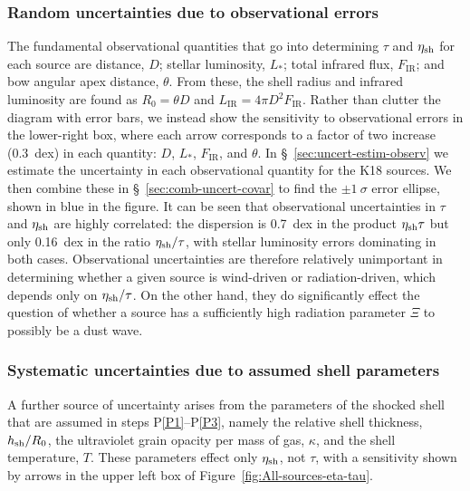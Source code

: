 \message{ !name(bs-bw-dw-03.tex)}\documentclass[useAMS, usenatbib, a4paper]{mnras}
\begin{document}
\subsubsection{Random uncertainties due to observational errors}
\label{sec:rand-syst-uncert}

The fundamental observational quantities that go into determining
\(\tau\) and \(\eta_{\text{sh}}\) for each source are distance, \(D\);
stellar luminosity, \(L_*\); total infrared flux, \(F_{\text{IR}}\);
and bow angular apex distance, \(\theta\).  From these, the shell
radius and infrared luminosity are found as \(R_0 = \theta D\) and
\(L_{\text{IR}} = 4\pi D^2 F_{\text{IR}}\).  Rather than clutter the
diagram with error bars, we instead show the sensitivity to
observational errors in the lower-right box, where each arrow
corresponds to a factor of two increase (0.3~dex) in each quantity:
\(D\), \(L_*\), \(F_{\text{IR}}\), and \(\theta\).  In
\S~\ref{sec:uncert-estim-observ} we estimate the uncertainty in each
observational quantity for the K18 sources.  We then combine these in
\S~\ref{sec:comb-uncert-covar} to find the \(\pm 1~\sigma\) error
ellipse, shown in blue in the figure.  It can be seen that
observational uncertainties in \(\tau\) and \(\eta_{\text{sh}}\) are highly
correlated: the dispersion is \SI{0.7}{dex} in the product
\(\eta_{\text{sh}} \tau\) but only \SI{0.16}{dex} in the ratio
\(\eta_{\text{sh}}/\tau\), with stellar luminosity errors dominating in both
cases.  Observational uncertainties are therefore relatively
unimportant in determining whether a given source is wind-driven or
radiation-driven, which depends only on \(\eta_{\text{sh}}/\tau\).  On the
other hand, they do significantly effect the question of whether a
source has a sufficiently high radiation parameter \(\Xi\) to possibly
be a dust wave.

\subsubsection{Systematic uncertainties due to assumed shell parameters}
\label{sec:syst-uncert-due}

A further source of uncertainty arises from the parameters of the
shocked shell that are assumed in steps P\ref{P1}--P\ref{P3}, namely
the relative shell thickness, \(h_{\text{sh}}/R_0\), the ultraviolet grain
opacity per mass of gas, \(\kappa\), and the shell temperature, \(T\).
These parameters effect only \(\eta_{\text{sh}}\), not \(\tau\), with a
sensitivity shown by arrows in the upper left box of
Figure~\ref{fig:All-sources-eta-tau}.
\end{document}
